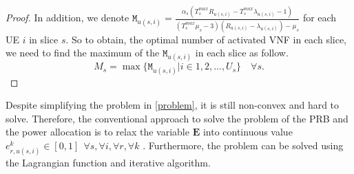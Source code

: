\documentclass[conference]{IEEEtran}
\begin{document}
\begin{proof}
In addition, we denote $\mathtt{M}_{u(s,i)} = \frac{\alpha_s(T^{max}_s R_{u(s,i)}-T^{max}_s\lambda_{u(s,i)} -1)}{(T^{max}_s\mu_s-3)(R_{u(s,i)}-\lambda_{u(s,i)}) - \mu_s }$ for each UE $i$ in slice $s$.
So to obtain, the optimal number of activated VNF in each slice, we need to find the maximum of the
$\mathtt{M}_{u(s,i)}$ in each slice as follow.
\begin{equation}
M_s = \max\{\mathtt{M}_{u(s,i)} | i \in 1,2,..., U_s\} \quad \forall s .
\end{equation}
\end{proof}

Despite simplifying the problem in \eqref{problem}, it is still non-convex and hard to solve.
Therefore, the conventional approach to solve the problem of the PRB and the power allocation is to relax the variable $\mathbf{E}$ into continuous value $e_{r,u(s,i)}^k \in [0,1] \:\: \forall s , \forall i ,\forall r, \forall k$ \cite{lee2018dynamic,ali2018joint}.
Furthermore, the problem can be solved using the Lagrangian function and iterative algorithm.
\end{document}
